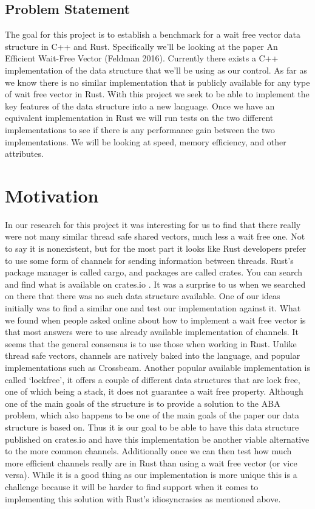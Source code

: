 \documentclass[conference]{IEEEtran}
\begin{document}
\subsection{Problem Statement}

The goal for this project is to establish a benchmark for a wait free vector data structure in C++ and Rust. Specifically we’ll be looking at the paper An Efficient Wait-Free Vector (Feldman 2016). Currently there exists a C++ implementation of the data structure that we’ll be using as our control. As far as we know there is no similar implementation that is publicly available for any type of wait free vector in Rust. With this project we seek to be able to implement the key features of the data structure into a new language. Once we have an equivalent implementation in Rust we will run tests on the two different implementations to see if there is any performance gain between the two implementations. We will be looking at speed, memory efficiency, and other attributes.

\section{Motivation}

In our research for this project it was interesting for us to find that there really were not many similar thread safe shared vectors, much less a wait free one. Not to say it is nonexistent, but for the most part it looks like Rust developers prefer to use some form of channels for sending information between threads. Rust’s package manager is called cargo, and packages are called crates. You can search and find what is available on crates.io . It was a surprise to us when we searched on there that there was no such data structure available. One of our ideas initially was to find a similar one and test our implementation against it. 
What we found when people asked online about how to implement a wait free vector is that most answers were to use already available implementation of channels. It seems that the general consensus is to use those when working in Rust. Unlike thread safe vectors, channels are natively baked into the language, and popular implementations such as Crossbeam.
Another popular available implementation is called ‘lockfree’, it offers a couple of different data structures that are lock free, one of which being a stack, it does not guarantee a wait free property. Although one of the main goals of the structure is to provide a solution to the ABA problem, which also happens to be one of the main goals of the paper our data structure is based on. 
Thus it is our goal to be able to have this data structure published on crates.io and have this implementation be another viable alternative to the more common channels. Additionally once we can then test how much more efficient channels really are in Rust than using a wait free vector (or vice versa).
While it is a good thing as our implementation is more unique this is a challenge because it will be harder to find support when it comes to implementing this solution with Rust’s idiosyncrasies as mentioned above.
\end{document}
